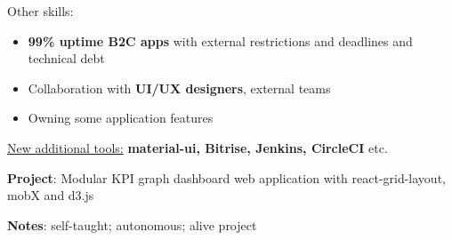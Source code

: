 \documentclass[10pt,a4paper,ragged2e,withhyper]{altacv}
\begin{document}
\medskip
Other skills:
\begin{itemize}
  \item \textbf{99\% uptime B2C apps} with external restrictions and deadlines and technical debt
  \item Collaboration with \textbf{UI/UX designers}, external teams
  \item Owning some application features
\end{itemize}
\begin{itshape}
  \underline{New additional tools:}
  \small{\textbf{material-ui, Bitrise, Jenkins, CircleCI} etc.}
\end{itshape}

\divider

\textbf{Project}: Modular KPI graph dashboard web application with react-grid-layout, mobX and d3.js\

\textbf{Notes}: self-taught; autonomous; alive project
\end{document}
